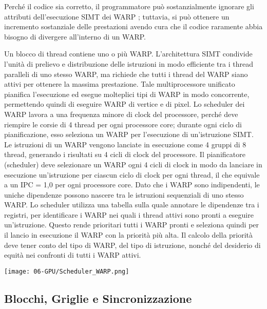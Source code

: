 Perché il codice sia corretto, il programmatore può sostanzialmente ignorare gli attributi dell'esecuzione SIMT dei WARP ; tuttavia, si può ottenere un incremento sostanziale delle prestazioni avendo cura che il codice raramente abbia bisogno di divergere all'interno di un WARP. 

\noindent
\begin{minipage}[c]{0.6\textwidth} %
Un blocco di thread contiene uno o più WARP. L'architettura SIMT condivide l'unità di prelievo e distribuzione delle istruzioni in modo efficiente tra i thread paralleli di uno stesso WARP, ma richiede che tutti i thread del WARP siano attivi per ottenere la massima prestazione. Tale multiprocessore unificato pianifica l'esecuzione ed esegue molteplici tipi di WARP in modo concorrente, permettendo quindi di eseguire WARP di vertice e di pixel. Lo scheduler dei WARP lavora a una frequenza minore di clock del processore, perché deve riempire le corsie di 4 thread per ogni processore core; durante ogni ciclo di pianificazione, esso seleziona un WARP per l'esecuzione di un'istruzione SIMT. Le istruzioni di un WARP vengono lanciate in esecuzione come 4 gruppi di 8 thread, generando i risultati su 4 cicli di clock del processore. Il pianificatore (scheduler) deve selezionare un WARP ogni 4 cicli di clock in modo da lanciare in esecuzione un'istruzione per ciascun ciclo di clock per ogni thread, il che equivale a un IPC = 1,0 per ogni processore core. Dato che i WARP sono indipendenti, le uniche dipendenze possono nascere tra le istruzioni sequenziali di uno stesso WARP. Lo scheduler utilizza una tabella sulla quale annotare le dipendenze tra i registri, per identificare i WARP nei quali i thread attivi sono pronti a eseguire un'istruzione. Questo rende prioritari tutti i WARP pronti e seleziona quindi per il lancio in esecuzione il WARP con la priorità più alta. Il calcolo della priorità deve tener conto del tipo di WARP, del tipo di istruzione, nonché del desiderio di equità nei confronti di tutti i WARP attivi.

\end{minipage}%
\begin{minipage}[c]{0.35\textwidth} %
    \centering
    \texttt{[image: 06-GPU/Scheduler\_WARP.png]}
\end{minipage}

\subsection{Blocchi, Griglie e Sincronizzazione}


